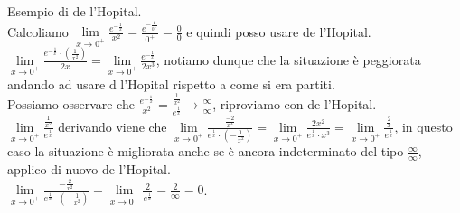 \begin{example}
Esempio di de l'Hopital. \\
Calcoliamo $\lim\limits_{x\to 0^+}\frac{e^{-\frac{1}{x}}}{x^2} = \frac{e^{-\frac{1}{0^+}}}{0^+} = \frac{0}{0}$ e quindi posso usare de l'Hopital.\\
$\lim\limits_{x\to 0^+}\frac{e^{-\frac{1}{x}} \cdot (\frac{1}{x^2})}{2x} = \lim\limits_{x\to 0^+}\frac{e^{-\frac{1}{x}}}{2x^3}$, notiamo dunque che la situazione è peggiorata andando ad usare d l'Hopital rispetto a come si era partiti.\\
Possiamo osservare che $\frac{e^{-\frac{1}{x}}}{x^2} = \frac{\frac{1}{x^2}}{e^{\frac{1}{x}}} \to \frac{\infty}{\infty}$, riproviamo con de l'Hopital.\\
$\lim\limits_{x\to 0^+}\frac{\frac{1}{x^2}}{e^{\frac{1}{x}}}$ derivando viene che $\lim\limits_{x\to 0^+}\frac{\frac{-2}{x^3}}{e^{\frac{1}{x}} \cdot (-\frac{1}{x^2})} = \lim\limits_{x\to 0^+}\frac{2x^2}{e^{\frac{1}{x}} \cdot x^3} = \lim\limits_{x\to 0^+}\frac{\frac{2}{x}}{e^{\frac{1}{x}}}$, in questo caso la situazione è migliorata anche se è ancora indeterminato del tipo $\frac{\infty}{\infty}$, applico di nuovo de l'Hopital.\\
$\lim\limits_{x\to 0^+}\frac{-\frac{2}{x^2}}{e^{\frac{1}{x}} \cdot (-\frac{1}{x^2})} = \lim\limits_{x\to 0^+}\frac{2}{e^{\frac{1}{x}}} = \frac{2}{\infty} = 0$.
\end{example}

